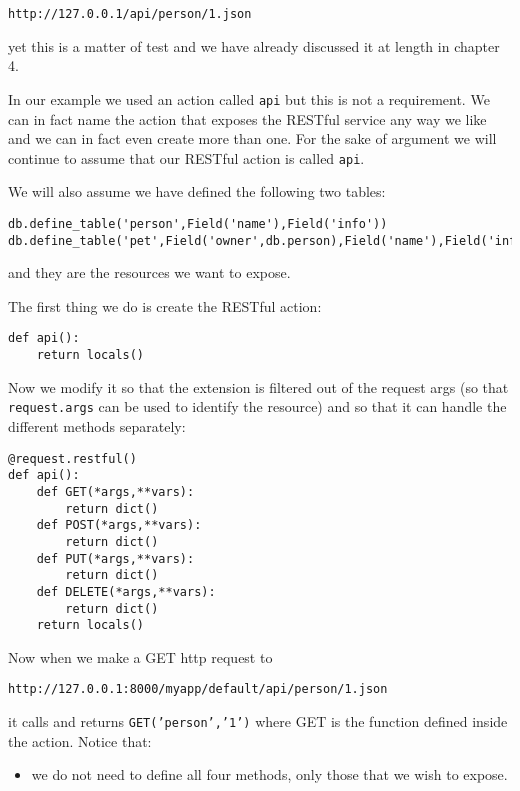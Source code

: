\documentclass[justified,sixbynine,notoc]{tufte-book}
\def\ft{\small\tt}
\begin{document}
\begin{fullwidth}
\begin{lstlisting}[keywords={}]
http://127.0.0.1/api/person/1.json
\end{lstlisting}
\noindent yet this is a matter of test and we have already discussed it at length in chapter 4.

In our example we used an action called {\ft api} but this is not a requirement. We can in fact name the action that exposes the RESTful service any way we like and we can in fact even create more than one. For the sake of argument we will continue to assume that our RESTful action is called {\ft api}.

We will also assume we have defined the following two tables:

\begin{lstlisting}
db.define_table('person',Field('name'),Field('info'))
db.define_table('pet',Field('owner',db.person),Field('name'),Field('info'))
\end{lstlisting}
\noindent and they are the resources we want to expose.

The first thing we do is create the RESTful action:

\begin{lstlisting}
def api():
    return locals()
\end{lstlisting}

Now we modify it so that the extension is filtered out of the request args (so that {\ft request.args} can be used to identify the resource) and so that it can handle the different methods separately:

\begin{lstlisting}
@request.restful()
def api():
    def GET(*args,**vars):
        return dict()
    def POST(*args,**vars):
        return dict()
    def PUT(*args,**vars):
        return dict()
    def DELETE(*args,**vars):
        return dict()
    return locals()
\end{lstlisting}

Now when we make a GET http request to

\begin{lstlisting}[keywords={}]
http://127.0.0.1:8000/myapp/default/api/person/1.json
\end{lstlisting}
\noindent it calls and returns {\ft GET('person','1')} where GET is the function defined inside the action. Notice that:
\begin{itemize}
\item we do not need to define all four methods, only those that we wish to expose.


\end{itemize}
\end{fullwidth}
\end{document}
